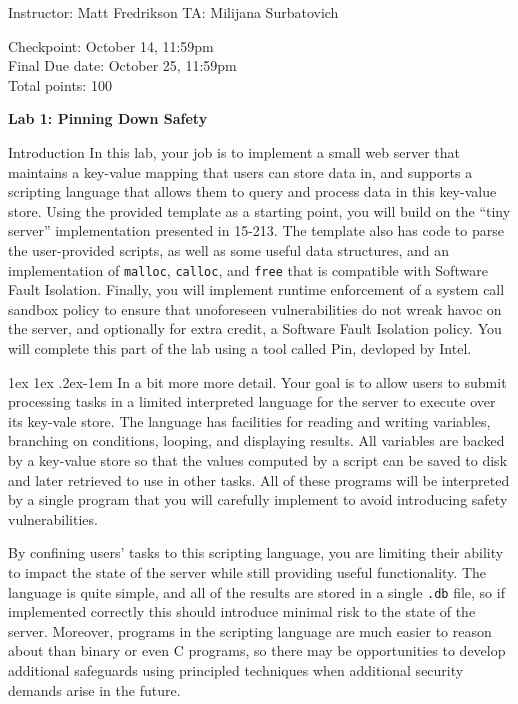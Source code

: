 \documentclass[11pt]{article}
\makeatletter
\newcommand*{\stuname}{}
\renewcommand{\paragraph}{%
  \@startsection{paragraph}{4}%
  {\z@}{1ex \@plus 1ex \@minus .2ex}{-1em}%
  {\normalfont\normalsize\bfseries}
}
\newcommand*{\assignmentnumb}{1}
\makeatother
\begin{document}
\centerline{Instructor: Matt Fredrikson \hfill TA: Milijana Surbatovich} 
Checkpoint: October 14, 11:59pm \\
Final Due date: October 25, 11:59pm \\
Total points: 100 \\
\vspace{1.5ex}
\centerline{\Large\bf Lab \assignmentnumb: Pinning Down Safety}
\vspace{0.5ex}
\centerline{\Large\bf \stuname}

\begin{problem}{Introduction}
    In this lab, your job is to implement a small web server that maintains a key-value mapping that users can store data in, and supports a scripting language that allows them to query and process data in this key-value store.
    Using the provided template as a starting point, you will build on the ``tiny server'' implementation presented in 15-213.
    The template also has code to parse the user-provided scripts, as well as some useful data structures, and an implementation of \verb'malloc', \verb'calloc', and \verb'free' that is compatible with Software Fault Isolation.
    Finally, you will implement runtime enforcement of a system call sandbox policy to ensure that unoforeseen vulnerabilities do not wreak havoc on the server, and optionally for extra credit, a Software Fault Isolation policy.
    You will complete this part of the lab using a tool called Pin, devloped by Intel.
    
  \paragraph{In a bit more more detail.}
    Your goal is to allow users to submit processing tasks in a limited interpreted language for the server to execute over its key-vale store. 
    The language has facilities for reading and writing variables, branching on conditions, looping, and displaying results. 
    All variables are backed by a key-value store so that the values computed by a script can be saved to disk and later retrieved to use in other tasks. 
    All of these programs will be interpreted by a single program that you will carefully implement to avoid introducing safety vulnerabilities.
    
    By confining users' tasks to this scripting language, you are limiting their ability to impact the state of the server while still providing useful functionality. The language is quite simple, and all of the results are stored in a single \verb'.db' file, so if implemented correctly this should introduce minimal risk to the state of the server. Moreover, programs in the scripting language are much easier to reason about than binary or even C programs, so there may be opportunities to develop additional safeguards using principled techniques when additional security demands arise in the future.
  

\end{problem}
\end{document}
